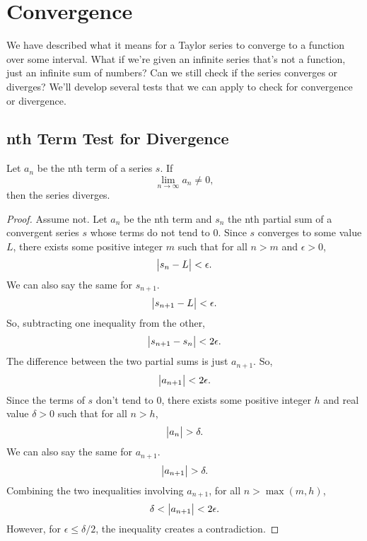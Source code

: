 \section{Convergence}
We have described what it means for a Taylor series to converge to a function over some interval.
What if we're given an infinite series that's not a function, just an infinite sum of numbers?
Can we still check if the series converges or diverges?
We'll develop several tests that we can apply to check for convergence or divergence.

\subsection{nth Term Test for Divergence}
\begin{lemma}
	Let $a_n$ be the nth term of a series $s$.
	If
	\begin{equation*}
		\lim_{n\to\infty}{a_n} \neq 0,
	\end{equation*}
	then the series diverges.
\end{lemma}
\begin{proof}
	Assume not.
	Let $a_n$ be the nth term and $s_n$ the nth partial sum of a convergent series $s$ whose terms do not tend to 0.
	Since $s$ converges to some value $L$, there exists some positive integer $m$ such that for all  $n > m$ and $\epsilon > 0$,
	\begin{equation*}
		\big\lvert s_n - L \big\rvert < \epsilon.
	\end{equation*}
	We can also say the same for $s_{n+1}$.
	\begin{equation*}
		\big\lvert s_{n+1}-L \big\rvert < \epsilon.
	\end{equation*}
	So, subtracting one inequality from the other,
	\begin{equation*}
		\big\lvert s_{n+1}-s_n \big\rvert < 2\epsilon.
	\end{equation*}
	The difference between the two partial sums is just $a_{n+1}$.
	So,
	\begin{equation*}
		\big\lvert a_{n+1} \big\rvert < 2\epsilon.
	\end{equation*}
	Since the terms of $s$ don't tend to 0, there exists some positive integer $h$ and real value $\delta > 0$ such that for all $n > h$,
	\begin{equation*}
		\big\lvert a_n \big\rvert > \delta.
	\end{equation*}
	We can also say the same for $a_{n+1}$.
	\begin{equation*}
		\big\lvert a_{n+1} \big\rvert > \delta.
	\end{equation*}
	Combining the two inequalities involving $a_{n+1}$, for all $n > \max{(m,h)}$,
	\begin{equation*}
		\delta < \big\lvert a_{n+1} \big\rvert < 2\epsilon.
	\end{equation*}
	However, for $\epsilon \leq \delta/2$, the inequality creates a contradiction.
\end{proof}

